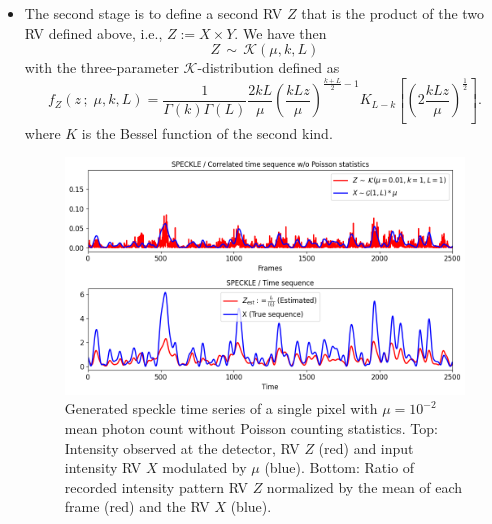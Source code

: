 \documentclass[11pt]{article}
\theoremstyle{definition}
\begin{document}
\begin{itemize}
\item The second stage is to define a second RV $Z$ that is the product of the two RV defined above, i.e., $Z:=X\times Y$. We have then
%
\begin{equation}
Z  \, \sim \, \mathcal{K}(\mu, k, L) 
\label{PDF_Z|Y}
\end{equation}
%
with the three-parameter $\mathcal{K}$-distribution 
defined as 
%
\begin{equation}
f_Z(z \,;\; \mu, k, L) = \frac{1}{\Gamma(k)\Gamma(L)}\frac{2kL}{\mu}\left(\frac{kLz}{\mu} \right)^{\frac{k+L}{2}-1} K_{L-k} \left[ \left( 2\frac{kLz}{\mu}\right)^{\frac{1}{2}}\right] .
\label{PDF_K}
\end{equation}
% 
where $K$ is the Bessel function of the second kind.
\begin{figure}[h!]
    \centering
    \includegraphics[width=120mm]{speckl_noPoi_newlegend.png}
    \caption{Generated speckle time series of a single pixel with \(\mu = 10^{-2}\) mean photon count without Poisson counting statistics. Top: Intensity observed at the detector, RV \(Z\) (red) and input intensity RV \(X\) modulated by \(\mu\) (blue). Bottom: Ratio of recorded intensity pattern RV \(Z\) normalized by the mean of each frame (red) and the RV \(X\) (blue).}
    \label{fig:speckle_noPoi}
\end{figure}


\end{itemize}
\end{document}

